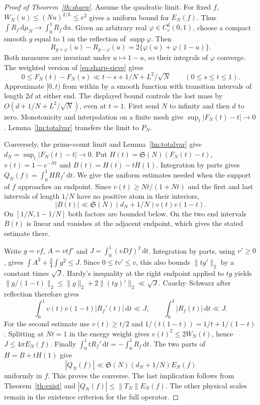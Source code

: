 \documentclass[11pt,a4paper]{article}
\newcommand{\SSg}{\mathfrak S}
\newcommand{\dd}{\,\mathrm d}
\DeclareMathOperator{\supp}{supp}
\begin{document}
\begin{proof}[Proof of Theorem~\ref{th:sharp}]
Assume the quadratic limit. For fixed $f$, $W_N(u)\le(Nu)^{2/L}\le e^2$ gives a uniform bound for $E_N(f)$. Thus $\int R_f\dd\mu_N\to\int_0^1R_f\dd u$. Given an arbitrary real $\varphi\in C_c^6(0,1)$, choose a compact smooth $g$ equal to $1$ on the reflection of $\supp\varphi$. Then
\[
 R_{g+\varphi}(u)-R_{g-\varphi}(u)=2\{\varphi(u)+\varphi(1-u)\}.
\]
Both measures are invariant under $u\mapsto1-u$, so their integrals of $\varphi$ converge. The weighted version of \eqref{eq:sharp-sieve} gives
\[
 0\le F_N(t)-F_N(s)\ll t-s+1/N+L^2/\sqrt N
 \qquad(0\le s\le t\le1).
\]
Approximate $[0,t)$ from within by a smooth function with transition intervals of length $2d$ at either end. The displayed bound controls the lost mass by $O(d+1/N+L^2/\sqrt N)$, even at $t=1$. First send $N$ to infinity and then $d$ to zero. Monotonicity and interpolation on a finite mesh give $\sup_t|F_N(t)-t|\to0$. Lemma~\ref{lm:totalvar} transfers the limit to $P_N$.

Conversely, the prime-count limit and Lemma~\ref{lm:totalvar} give $d_N=\sup_t|F_N(t)-t|\to0$. Put $H(t)=\SSg(N)(F_N(t)-t)$, $v(t)=1-e^{-Nt}$ and $B(t)=H(t)-tH(1)$. Integration by parts gives $Q_N(f)=\int_0^1 H R_f'\dd t$. We give the uniform estimates needed when the support of $f$ approaches an endpoint. Since $v(t)\ge Nt/(1+Nt)$ and the first and last intervals of length $1/N$ have no positive atom in their interiors,
\[
 |B(t)|\ll \SSg(N)(d_N+1/N)v(t)v(1-t).
\]
On $[1/N,1-1/N]$ both factors are bounded below. On the two end intervals $B(t)$ is linear and vanishes at the adjacent endpoint, which gives the stated estimate there.

Write $g=vf$, $A=vtf'$ and $J=\int_0^1(vDf)^2\dd t$. Integration by parts, using $v'\ge0$, gives $\int A^2+\tfrac34\int g^2\le J$. Since $0\le tv'\le v$, this also bounds $\|tg'\|_2$ by a constant times $\sqrt J$. Hardy's inequality at the right endpoint applied to $tg$ yields
$\|g/(1-t)\|_2\le\|g\|_2+2\|(tg)'\|_2\ll\sqrt J$.
Cauchy--Schwarz after reflection therefore gives
\[
 \int_0^1 v(t)v(1-t)|R_f'(t)|\dd t\ll J,\qquad
 \int_0^1|R_f(t)|\dd t\ll J.
\]
For the second estimate use $v(t)\ge t/2$ and
$1/(t(1-t))=1/t+1/(1-t)$. Splitting at $Nt=1$ in the energy weight gives $v(t)^2\le2W_N(t)$, hence $J\le4\pi E_N(f)$. Finally $\int_0^1 tR_f'\dd t=-\int_0^1 R_f\dd t$. The two parts of $H=B+tH(1)$ give
\[
 |Q_N(f)|\ll\SSg(N)(d_N+1/N)E_N(f)
\]
uniformly in $f$. This proves the converse. The last implication follows from Theorem~\ref{th:exist} and $|Q_N(f)|\le\|T_N\|E_N(f)$. The other physical scales remain in the existence criterion for the full operator.
\end{proof}
\end{document}
